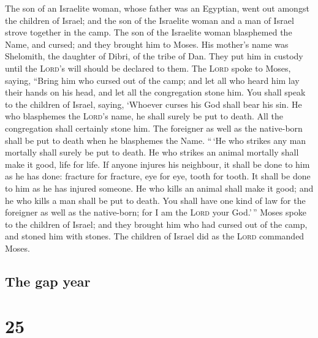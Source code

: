  The son of an Israelite woman, whose father was an
Egyptian, went out amongst the children of Israel; and the son of the
Israelite woman and a man of Israel strove together in the camp.
 The son of the Israelite woman blasphemed the Name, and
cursed; and they brought him to Moses. His mother's name was Shelomith,
the daughter of Dibri, of the tribe of Dan.  They put him
in custody until the \textsc{Lord}'s will should be declared to them.
 The \textsc{Lord} spoke to Moses, saying,
 ``Bring him who cursed out of the camp; and let all who
heard him lay their hands on his head, and let all the congregation
stone him.  You shall speak to the children of Israel,
saying, `Whoever curses his God shall bear his sin.  He
who blasphemes the \textsc{Lord}'s name, he shall surely be put to
death. All the congregation shall certainly stone him. The foreigner as
well as the native-born shall be put to death when he blasphemes the
Name.  ``\,`He who strikes any man mortally shall surely
be put to death.  He who strikes an animal mortally shall
make it good, life for life.  If anyone injures his
neighbour, it shall be done to him as he has done: 
fracture for fracture, eye for eye, tooth for tooth. It shall be done to
him as he has injured someone.  He who kills an animal
shall make it good; and he who kills a man shall be put to death.
 You shall have one kind of law for the foreigner as well
as the native-born; for I am the \textsc{Lord} your God.'\,''
 Moses spoke to the children of Israel; and they brought
him who had cursed out of the camp, and stoned him with stones. The
children of Israel did as the \textsc{Lord} commanded Moses.

\hypertarget{the-gap-year}{%
\subsection{The gap year}\label{the-gap-year}}

\hypertarget{section-24}{%
\section{25}\label{section-24}}

